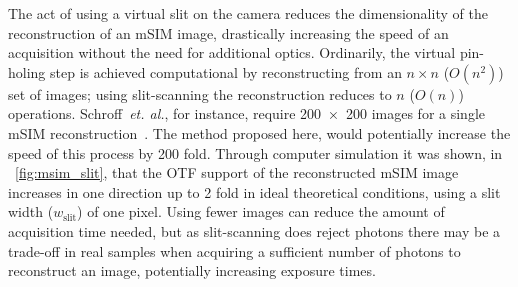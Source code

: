 The act of using a virtual slit on the camera reduces the dimensionality of the reconstruction of an \gls{mSIM} image, drastically increasing the speed of an acquisition without the need for additional optics.
Ordinarily, the virtual pin-holing step is achieved computational by reconstructing from an \(n\times n\) (\(O(n^2)\)) set of images; using \gls{slit-scanning} the reconstruction reduces to $n$ (\(O(n)\)) operations.
Schroff~\emph{et. al.}, for instance, require \SI{200 x 200}{} images for a single \gls{mSIM} reconstruction~\cite{yorkResolutionDoublingLive2012}.
The method proposed here, would potentially increase the speed of this process by \SI{200}{} fold.
Through computer simulation it was shown, in \figurename~\ref{fig:msim_slit}, that the \gls{OTF} support of the reconstructed \gls{mSIM} image increases in one direction up to \SI{2}{} fold in ideal theoretical conditions, using a slit width (\(w_{\text{slit}}\)) of one pixel.
Using fewer images can reduce the amount of acquisition time needed, but as \gls{slit-scanning} does reject photons there may be a trade-off in real samples when acquiring a sufficient number of photons to reconstruct an image, potentially increasing exposure times.
